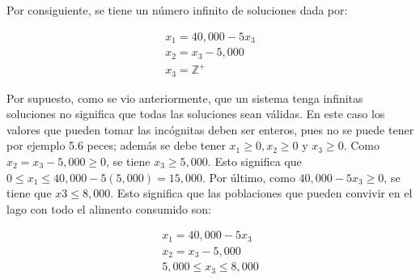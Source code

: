 \documentclass{article}
\begin{document}
Por consiguiente, se tiene un número infinito de soluciones dada por: 

\begin{equation*}
    \begin{aligned}
        x_1 = 40,000 - 5x_3\\
        x_2 = x_3 - 5,000\\
        x_3 = \mathbb{Z}^+
    \end{aligned}
\end{equation*}

Por supuesto, como se vio anteriormente, que un sistema tenga infinitas soluciones no significa que todas las soluciones sean válidas. En este caso los valores que pueden tomar las incógnitas deben ser enteros, pues no se puede tener por ejemplo 5.6 peces; además se debe tener $x_1 \geq 0, x_2 \geq 0$ y $x_3 \geq 0$. Como $x_2 = x_3 - 5,000 \geq 0$, se tiene $x_3 \geq 5,000$. Esto significa que $0 \leq x_1 \leq 40,000 - 5(5,000)= 15,000$. Por último, como $40,000 - 5x_3 \geq 0$, se tiene que $x3 \leq 8,000$. Esto significa que las poblaciones que pueden convivir en el lago con todo el alimento consumido son: 

\begin{equation*}
    \begin{aligned}
        x_1 = 40,000 -5x_3\\
        x_2 = x_3 - 5,000\\
        5,000 \leq x_3 \leq 8,000
    \end{aligned}
\end{equation*}
\end{document}
